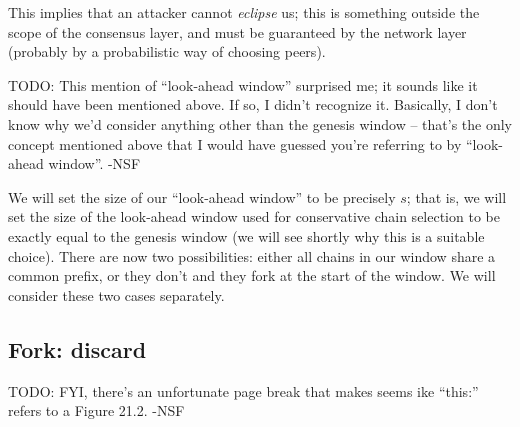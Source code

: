 This implies that an attacker cannot \emph{eclipse} us; this is something
outside the scope of the consensus layer, and must be guaranteed by the network
layer (probably by a probabilistic way of choosing peers).

 TODO: This mention of ``look-ahead window'' surprised me; it sounds
like it should have been mentioned above. If so, I didn't recognize it.
Basically, I don't know why we'd consider anything other than the genesis
window -- that's the only concept mentioned above that I would have guessed
you're referring to by ``look-ahead window''. -NSF

We will set the size of our ``look-ahead window'' to be precisely $s$; that is,
we will set the size of the look-ahead window used for conservative chain
selection to be exactly equal to the genesis window (we will see shortly why
this is a suitable choice). There are now two possibilities: either all chains
in our window share a common prefix, or they don't and they fork at the start of
the window. We will consider these two cases separately.

\subsection{Fork: discard}
\label{genesis:discard}

 TODO: FYI, there's an unfortunate page break that makes seems ike
``this:'' refers to a Figure 21.2. -NSF


